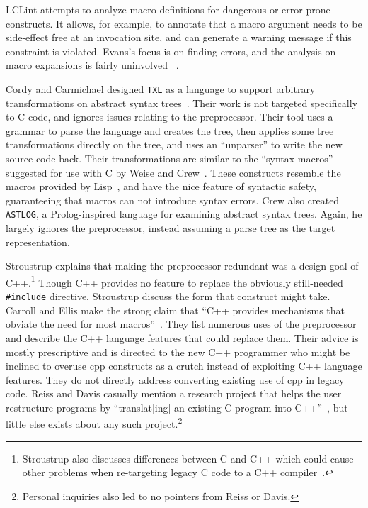 \documentclass{article}
\newcommand{\Cpp}{\mbox{\textsf{cpp}}}
\newcommand{\CPP}{\mbox{\textsf{C++}}}
\newcommand{\C}{\mbox{\textsf{C}}}
\newcommand{\ppd}[1]{\texttt{\##1}}
\begin{document}
LCLint attempts to analyze macro definitions for
dangerous or error-prone constructs.  It allows, for example, to
annotate that a macro argument needs to be side-effect free at an
invocation site, and can generate a warning message if this constraint
is violated.  Evans's focus is on finding errors, and the
analysis on macro expansions is fairly uninvolved
~\cite[Ch.~8]{LCLint}.

Cordy and Carmichael designed \texttt{TXL} as a language to support
arbitrary transformations on abstract syntax trees~\cite{TXL}.  Their
work is not targeted specifically to \C{} code, and ignores issues
relating to the preprocessor.  Their tool uses a grammar to parse the
language and creates the tree, then applies some tree transformations
directly on the tree, and uses an ``unparser'' to write the new source
code back.  Their transformations are similar to the ``syntax macros''
suggested for use with \C{} by Weise and Crew~\cite{Weise93}.  These
constructs resemble the macros provided by Lisp~\cite{Steele90}, and
have the nice feature of syntactic safety, guaranteeing that macros can
not introduce syntax errors. Crew also created \texttt{ASTLOG}, a
\textsf{Prolog}-inspired language for examining abstract syntax trees.
Again, he largely ignores the preprocessor, instead assuming a parse
tree as the target representation.

Stroustrup explains that making the preprocessor redundant was a design
goal of \CPP{}.\footnote{Stroustrup also discusses differences between
  \C{} and \CPP{} which could cause other problems when re-targeting
  legacy \C{} code to a \CPP{}
  compiler~\cite[p.~816-820]{Stroustrup97}.} Though \CPP{} provides no
feature to replace the obviously still-needed \ppd{include} directive,
Stroustrup discuss the form that construct
might take.   Carroll and Ellis make the strong claim that ``C++ provides
mechanisms that obviate the need for most
macros''~\cite[p.~147]{Carroll95}.  They list numerous uses of the
preprocessor and describe the \CPP{} language features that could
replace them.  Their advice is mostly prescriptive and is directed to
the new \CPP{} programmer who might be inclined to overuse \Cpp{}
constructs as a crutch instead of exploiting \CPP{} language features.
They do not directly address converting existing use of \Cpp{} in legacy
code.  Reiss and Davis casually mention a research project that helps
the user restructure programs by ``translat[ing] an existing \C{}
program into \CPP{}''~\cite[p.~2]{Reiss90}, but little else exists about
any such project.\footnote{Personal inquiries also led to no pointers
  from Reiss or Davis.}
\end{document}
